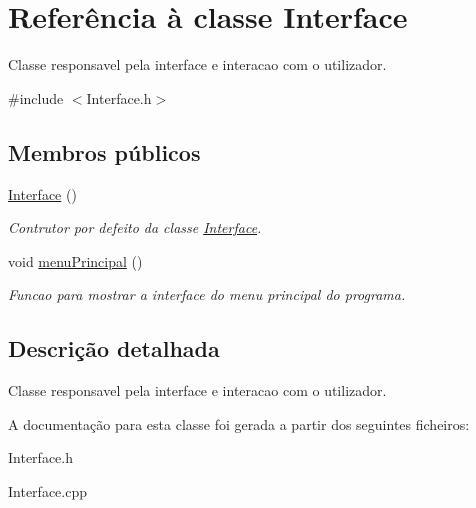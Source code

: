 \hypertarget{class_interface}{\section{Referência à classe Interface}
\label{class_interface}
}


Classe responsavel pela interface e interacao com o utilizador.  




{\ttfamily \#include $<$Interface.\-h$>$}

\subsection*{Membros públicos}
\begin{DoxyCompactItemize}
\item 
\hypertarget{class_interface_a4406d74c75bdfe150bf72be1f1cda8b1}{\hyperlink{class_interface_a4406d74c75bdfe150bf72be1f1cda8b1}{Interface} ()}\label{class_interface_a4406d74c75bdfe150bf72be1f1cda8b1}

\begin{DoxyCompactList}\small\item\em Contrutor por defeito da classe \hyperlink{class_interface}{Interface}. \end{DoxyCompactList}\item 
\hypertarget{class_interface_a417dd813f30bf427f6dd1fe57887a685}{void \hyperlink{class_interface_a417dd813f30bf427f6dd1fe57887a685}{menu\-Principal} ()}\label{class_interface_a417dd813f30bf427f6dd1fe57887a685}

\begin{DoxyCompactList}\small\item\em Funcao para mostrar a interface do menu principal do programa. \end{DoxyCompactList}\end{DoxyCompactItemize}


\subsection{Descrição detalhada}
Classe responsavel pela interface e interacao com o utilizador. 

A documentação para esta classe foi gerada a partir dos seguintes ficheiros\-:\begin{DoxyCompactItemize}
\item 
Interface.\-h\item 
Interface.\-cpp\end{DoxyCompactItemize}
